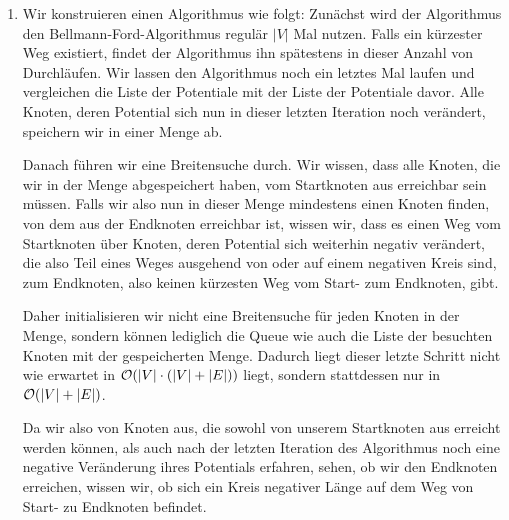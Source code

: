 \documentclass{scrartcl} %
\begin{document}
    \begin{aufgabe}
        \begin{enumerate}[label=(\alph*)]
            \item Wir konstruieren einen Algorithmus wie folgt: Zunächst wird der Algorithmus den Bellmann-Ford-Algorithmus regulär $\lvert V\rvert$ Mal nutzen. Falls ein kürzester Weg existiert, findet der Algorithmus ihn spätestens in dieser Anzahl von Durchläufen. Wir lassen den Algorithmus noch ein letztes Mal laufen und vergleichen die Liste der Potentiale mit der Liste der Potentiale davor. Alle Knoten, deren Potential sich nun in dieser letzten Iteration noch verändert, speichern wir in einer Menge ab.
        
            Danach führen wir eine Breitensuche durch. Wir wissen, dass alle Knoten, die wir in der Menge abgespeichert haben, vom Startknoten aus erreichbar sein müssen. Falls wir also nun in dieser Menge mindestens einen Knoten finden, von dem aus der Endknoten erreichbar ist, wissen wir, dass es einen Weg vom Startknoten über Knoten, deren Potential sich weiterhin negativ verändert, die also Teil eines Weges ausgehend von oder auf einem negativen Kreis sind, zum Endknoten, also keinen kürzesten Weg vom Start- zum Endknoten, gibt.
        
            Daher initialisieren wir nicht eine Breitensuche für jeden Knoten in der Menge, sondern können lediglich die Queue wie auch die Liste der besuchten Knoten mit der gespeicherten Menge. Dadurch liegt dieser letzte Schritt nicht wie erwartet in $\operatorname{\mathcal{O}}(\lvert V\rvert \cdot (\lvert V \rvert + \lvert E\rvert))$ liegt, sondern stattdessen nur in $\operatorname{\mathcal{O}}(\lvert V \rvert + \lvert E\rvert)$.
        
            Da wir also von Knoten aus, die sowohl von unserem Startknoten aus erreicht werden können, als auch nach der letzten Iteration des Algorithmus noch eine negative Veränderung ihres Potentials erfahren, sehen, ob wir den Endknoten erreichen, wissen wir, ob sich ein Kreis negativer Länge auf dem Weg von Start- zu Endknoten befindet.


\end{enumerate}
\end{aufgabe}
\end{document}

